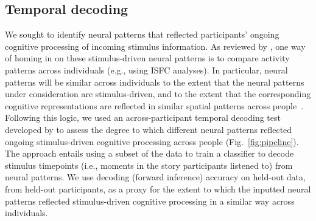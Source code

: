 \documentclass[english]{article}
\begin{document}
\subsection*{Temporal decoding}
We sought to identify neural patterns that reflected participants'
ongoing cognitive processing of incoming stimulus information.  As
reviewed by \cite{SimoEtal16}, one way of homing in on these
stimulus-driven neural patterns is to compare activity patterns across
individuals (e.g., using ISFC analyses).  In particular, neural
patterns will be similar across individuals to the extent that the
neural patterns under consideration are stimulus-driven, and to the
extent that the corresponding cognitive representations are reflected
in similar spatial patterns across people~\citep[also see][]{SimoChan20}.  Following this logic, we
used an across-participant temporal decoding test developed by
\cite{MannEtal18} to assess the degree to which different neural
patterns reflected ongoing stimulus-driven cognitive processing across
people (Fig.~\ref{fig:pipeline}).  The approach entails using a subset of the data to train a
classifier to decode stimulus timepoints (i.e., moments in the story
participants listened to) from neural patterns.  We use decoding
(forward inference) accuracy on held-out data, from held-out
participants, as a proxy for the extent to which the inputted neural
patterns reflected stimulus-driven cognitive processing in a similar
way across individuals.
\end{document}
